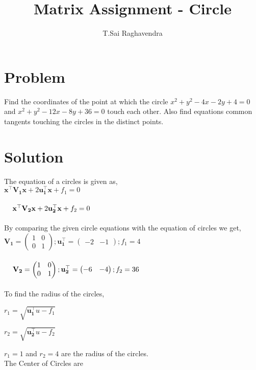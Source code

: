 \documentclass[journal,12pt,twocolumn]{IEEEtran}
\title{\mytitle}
\title{
Matrix Assignment - Circle
}
\author{T.Sai Raghavendra}
\newcommand{\myvec}[1]{\ensuremath{\begin{pmatrix}#1\end{pmatrix}}}
\let\vec\mathbf
\begin{document}
\maketitle
\tableofcontents
\bigskip


\section{Problem}
Find the coordinates of the point at which the circle $x^2+y^2-4x-2y+4=0$ and $x^2+y^2-12x-8y+36        =0$ touch each other. Also find equations common tangents touching the circles in the distinct points.\\


\section{Solution}
The equation of a circles is given as,   \\

${\vec{x^{\top}V_1 x} + 2\vec{u_1^{\top}x}} + f_1=0$
\\
\\
${\hspace{0.4cm}\vec{x^{\top}V_2 x} + 2\vec{u_2^{\top}x}} + f_2=0$
\\
\\
By comparing the given circle equations with the equation of circles we get,
\\

$\vec{V_1}=\myvec{1&0\\ 0&1} ; \vec{u_1^{\top}}=\myvec{-2&-1} ; f_1=4$
\\
\\
$\hspace*{0.4cm}\vec{V_2}=\myvec{1&0\\ 0&1} ; \vec{u_2^{\top}}=\myvec{-6&-4} ; f_2=36$
\\
\\

To find the radius of the circles,
\\
\begin{center}
$r_1 = {\sqrt{\vec{u_1^\top}u - f_1}}$
\end{center}

\begin{center}
$r_2 = {\sqrt{\vec{u_2^\top}u - f_2}}$
\end{center}

$r_1=1$ and $r_2=4$ are the radius of the circles.\\

The Center of Circles are \\
\end{document}
